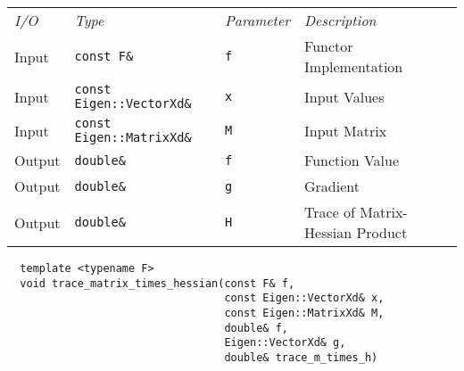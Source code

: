 \begin{tcolorbox}[colback=white,colframe=gray90, coltitle=black,boxrule=3pt,
fonttitle=\bfseries,title=Trace of Matrix-Hessian Product]

\begin{tabular}{llll}
\textit{I/O} & \textit{Type} & \textit{Parameter} & \textit{Description} \\
Input & \texttt{const F\&} & \texttt{f} & Functor Implementation \\
Input & \texttt{const Eigen::VectorXd\&} & \texttt{x} & Input Values \\
Input & \texttt{const Eigen::MatrixXd\&} & \texttt{M} & Input Matrix \\
Output & \texttt{double\&} & \texttt{f} & Function Value \\
Output & \texttt{double\&} & \texttt{g} & Gradient \\
Output & \texttt{double\&} & \texttt{H} & Trace of Matrix-Hessian Product
\end{tabular}

\vspace{5mm}

\begin{verbatim}
  template <typename F>
  void trace_matrix_times_hessian(const F& f,
                                  const Eigen::VectorXd& x,
                                  const Eigen::MatrixXd& M,
                                  double& f,
                                  Eigen::VectorXd& g,
                                  double& trace_m_times_h)
\end{verbatim}

\end{tcolorbox}

